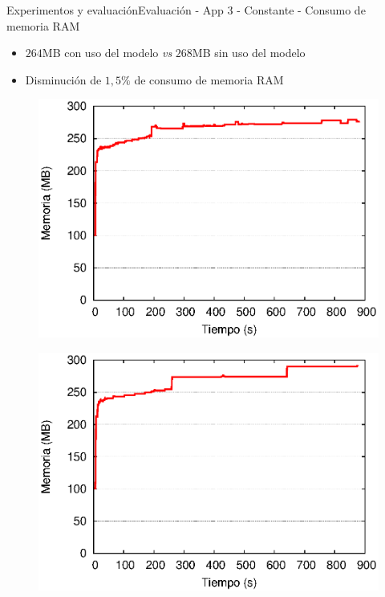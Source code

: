 \begin{frame}{Experimentos y evaluación}{Evaluación - App 3 - Constante - Consumo de memoria RAM}

\begin{itemize}
\item $264$MB con uso del modelo \textit{vs} $268$MB sin uso del modelo
\item Disminución de $1,5\%$ de consumo de memoria RAM
\end{itemize}

\begin{multicols}{2}
\begin{figure}[p]
	\centering
	\includegraphics[scale=0.475]{images/exp/app3/cm/fisical/consumeRAM.eps}
\end{figure}

\begin{figure}[p]
	\centering
	\includegraphics[scale=0.475]{images/exp/app3/sm/fisical/consumeRAM.eps}
\end{figure}
\end{multicols}
\end{frame}

